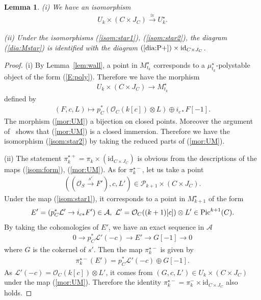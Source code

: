 \documentclass[11pt]{amsart}
\theoremstyle{plain}
\newtheorem{lem}[thm]{Lemma}
\newcommand{\aA}{\mathcal{A}}
\newcommand{\lL}{\mathcal{L}}
\newcommand{\oO}{\mathcal{O}}
\newcommand{\pP}{\mathcal{P}}
\newcommand{\Pic}{\mathop{\rm Pic}\nolimits}
\newcommand{\id}{\textrm{id}}
\begin{document}
\begin{lem}\label{lem:isom:star2}
(i) We have an isomorphism
\begin{align}\label{isom:star2}
U_k \times (C \times J_C) 
\stackrel{\cong}{\to}
U_k^{\star}.
\end{align}

(ii)
Under the isomorphisms (\ref{isom:star1}),
(\ref{isom:star2}), 
 the diagram (\ref{dia:Mstar}) is identified with the diagram 
$(\ref{dia:P+}) \times \mathrm{id}_{C \times J_C}$.   
\end{lem}
\begin{proof}
(i) By Lemma~\ref{lem:wall}, a point 
in $M_{t_k}^{\star}$ corresponds to a 
$\mu_{t_k}^{\star}$-polystable object of the form
(\ref{E:poly}). 
Therefore we have the morphism
\begin{align*}
U_k \times (C \times J_C) \to M_{t_k}^{\star}
\end{align*}
defined by 
\begin{align}\label{mor:UM}
(F, c, L)
 \mapsto p_C^{\ast}(\oO_C(k[c]) \otimes L) \oplus i_{c\ast}F[-1].
\end{align}
The morphism (\ref{mor:UM}) 
a bijection on closed points. 
Moreover the argument of~\cite[Lemma~9.21]{Toddbir}
shows that 
(\ref{mor:UM}) is a closed immersion. 
Therefore we have the isomorphism (\ref{isom:star2})
by taking the reduced parts of (\ref{mor:UM}). 

(ii) 
The statement $\pi_k^{\star +}=\pi_k \times (\id_{C \times J_C})$ 
is obvious from the descriptions of 
the maps (\ref{isom:form}), (\ref{mor:UM}). 
As for $\pi_k^{\star -}$, 
let us take a point
\begin{align*}
((\oO_S \stackrel{s'}{\to} F'), c, L')
\in \pP_{k+1} \times (C \times J_C).
\end{align*} 
Under the map (\ref{isom:star1}), 
it corresponds to a point in $M_{k+1}^{\star}$ of the form 
\begin{align*}
E'=(p_C^{\ast}\lL'\to i_{c\ast}F') \in \aA, \ 
\lL'=\oO_C((k+1)[c]) \otimes L' \in \Pic^{k+1}(C).
\end{align*}
By taking the cohomologies of $E'$, 
we have an exact sequence in $\aA$
\begin{align*}
0 \to p_C^{\ast}\lL'(-c) \to E' \to G[-1] \to 0
\end{align*}
where $G$ is the cokernel of $s'$. 
Then the map $\pi_k^{\star -}$ is given by
\begin{align*}
\pi_k^{\star -}(E')=
p_C^{\ast}\lL'(-c) \oplus G[-1]. 
\end{align*}
As $\lL'(-c)=\oO_C(k[c]) \otimes L'$, 
it comes from $(G, c, L') \in U_k \times (C \times J_C)$
under the map (\ref{mor:UM}). 
Therefore 
the identity 
$\pi_k^{\star - }=\pi_k^- \times \id_{C \times J_C}$
also 
holds. 
\end{proof}
\end{document}
